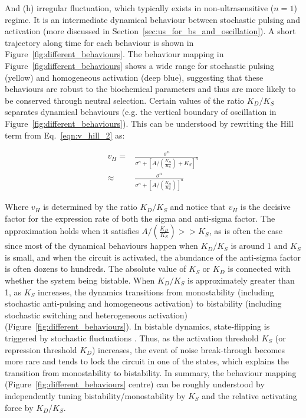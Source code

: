 And (h) irregular fluctuation, which typically exists
in non-ultrasensitive ($n = 1$) regime.
It is an intermediate dynamical behaviour between
stochastic pulsing and activation (more discussed in
Section~\ref{sec:us_for_bs_and_oscillation}).
A short trajectory along time for each behaviour is shown
in Figure~\ref{fig:different_behaviours}.
The behaviour mapping in Figure~\ref{fig:different_behaviours}
shows a wide range for stochastic pulsing (yellow) and 
homogeneous activation (deep blue), suggesting that these behaviours are
robust to the biochemical parameters and thus are more likely to be
conserved through neutral selection.
Certain values of the ratio $K_D/K_S$ separates dynamical behaviours
(e.g. the vertical boundary of oscillation in 
Figure~\ref{fig:different_behaviours}).
This can be understood by rewriting the Hill term from Eq.~\ref{eqn:v_hill_2}
as:

\begin{align}
    v_H =& \frac{\sigma^n}{\sigma^n + 
        \left[A/\left(\frac{K_D}{K_S}\right) + K_S\right]^n}\\
    \approx& \frac{\sigma^n}{\sigma^n + 
        \left[A/\left(\frac{K_D}{K_S}\right)\right]^n}
\end{align}

Where $v_H$ is determined by the ratio $K_D/K_S$ and
notice that $v_H$ is the decisive factor for the expression rate of both
the sigma and anti-sigma factor.
The approximation holds when it satisfies $A/(\frac{K_D}{K_S}) >> K_S$,
as is often the case since most of the dynamical behaviours
happen when $K_D/K_S$ is around 1 and $K_S$ is small,
and when the circuit is activated, the abundance of the anti-sigma factor
is often dozens to hundreds.
The absolute value of $K_S$ or $K_D$ is connected with whether the
system being bistable.
When $K_D/K_S$ is approximately greater than 1, as $K_S$ increases,
the dynamics transitions from monostability (including stochastic
anti-pulsing and homogeneous activation) to bistability (including
stochastic switching and heterogeneous activation)
(Figure~\ref{fig:different_behaviours}).
In bistable dynamics, state-flipping is triggered by stochastic
fluctuations \cite{eldar10a}.
Thus, as the activation threshold $K_S$ (or repression
threshold $K_D$) increases, the event of noise break-through becomes
more rare and tends to lock the circuit in one of the states,
which explains the transition from monostability to bistability.
In summary, the behaviour mapping (Figure~\ref{fig:different_behaviours}
centre) can be roughly understood by independently tuning
bistability/monostability by $K_S$ and the relative activating
force by $K_D/K_S$.

